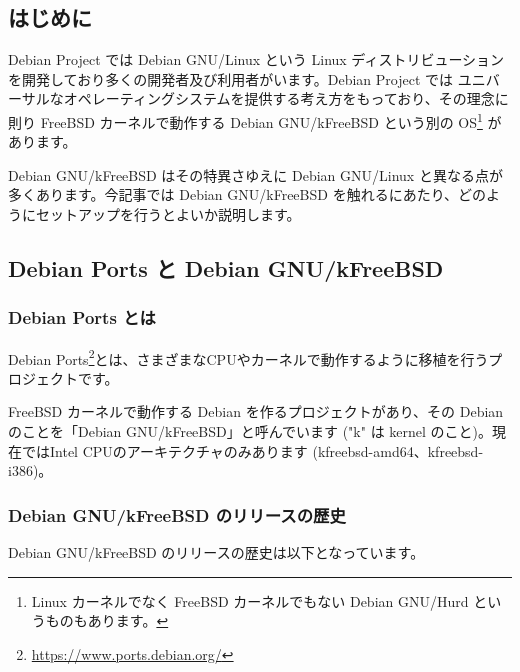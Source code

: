 \documentclass[mingoth,a4paper]{jsarticle}
\begin{document}
\subsection{はじめに}

Debian Project では Debian GNU/Linux という Linux ディストリビューションを開発しており多くの開発者及び利用者がいます。Debian Project では ユニバーサルなオペレーティングシステムを提供する考え方をもっており、その理念に則り FreeBSD カーネルで動作する Debian GNU/kFreeBSD という別の OS\footnote{Linux カーネルでなく FreeBSD カーネルでもない Debian GNU/Hurd というものもあります。} があります。

Debian GNU/kFreeBSD はその特異さゆえに Debian GNU/Linux と異なる点が多くあります。今記事では Debian GNU/kFreeBSD を触れるにあたり、どのようにセットアップを行うとよいか説明します。


\subsection{Debian Ports と Debian GNU/kFreeBSD}

\subsubsection{Debian Ports とは}

Debian Ports\footnote{\url{https://www.ports.debian.org/}}とは、さまざまなCPUやカーネルで動作するように移植を行うプロジェクトです。

FreeBSD カーネルで動作する Debian を作るプロジェクトがあり、その Debian のことを「Debian GNU/kFreeBSD」と呼んでいます ("k" は kernel のこと)。現在ではIntel CPUのアーキテクチャのみあります (kfreebsd-amd64、kfreebsd-i386)。

\subsubsection{Debian GNU/kFreeBSD のリリースの歴史}

Debian GNU/kFreeBSD のリリースの歴史は以下となっています。
\end{document}
